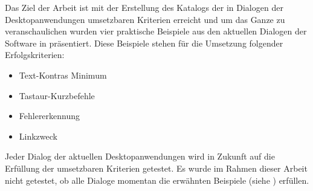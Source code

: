 Das Ziel der Arbeit ist mit der Erstellung des Katalogs der in Dialogen der Desktopanwendungen umsetzbaren Kriterien erreicht und um das Ganze zu veranschaulichen wurden vier praktische Beispiele aus den aktuellen Dialogen der Software in  präsentiert. Diese Beispiele stehen für die Umsetzung folgender Erfolgskriterien:

\begin{itemize}
	\item Text-Kontras Minimum
	\item Tastaur-Kurzbefehle
	\item Fehlererkennung
	\item Linkzweck
\end{itemize}

Jeder Dialog der aktuellen Desktopanwendungen wird in Zukunft auf die Erfüllung der umsetzbaren Kriterien getestet. Es wurde im Rahmen dieser Arbeit nicht getestet, ob alle Dialoge momentan die erwähnten Beispiele (siehe ) erfüllen.